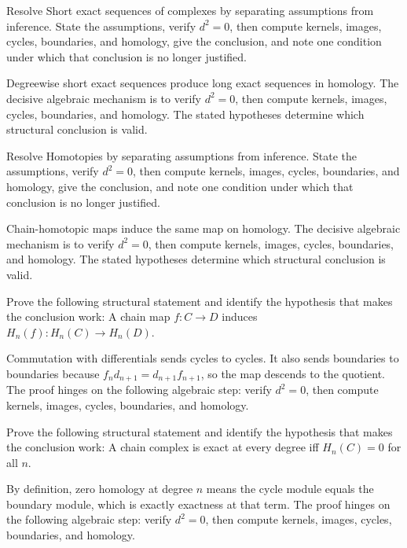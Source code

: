 \begin{problem}\label{prob:v22-problem-07}
Resolve Short exact sequences of complexes by separating assumptions from inference. State the assumptions, verify \(d^2=0\), then compute kernels, images, cycles, boundaries, and homology, give the conclusion, and note one condition under which that conclusion is no longer justified.
\end{problem}
\begin{solution}
Degreewise short exact sequences produce long exact sequences in homology. The decisive algebraic mechanism is to verify \(d^2=0\), then compute kernels, images, cycles, boundaries, and homology. The stated hypotheses determine which structural conclusion is valid.
\end{solution}

\begin{problem}\label{prob:v22-problem-08}
Resolve Homotopies by separating assumptions from inference. State the assumptions, verify \(d^2=0\), then compute kernels, images, cycles, boundaries, and homology, give the conclusion, and note one condition under which that conclusion is no longer justified.
\end{problem}
\begin{solution}
Chain-homotopic maps induce the same map on homology. The decisive algebraic mechanism is to verify \(d^2=0\), then compute kernels, images, cycles, boundaries, and homology. The stated hypotheses determine which structural conclusion is valid.
\end{solution}

\begin{problem}\label{prob:v22-problem-09}
Prove the following structural statement and identify the hypothesis that makes the conclusion work: A chain map $f:C\to D$ induces $H_n(f):H_n(C)\to H_n(D)$.
\end{problem}
\begin{solution}
Commutation with differentials sends cycles to cycles. It also sends boundaries to boundaries because $f_n d_{n+1}=d_{n+1}f_{n+1}$, so the map descends to the quotient. The proof hinges on the following algebraic step: verify \(d^2=0\), then compute kernels, images, cycles, boundaries, and homology.
\end{solution}

\begin{problem}\label{prob:v22-problem-10}
Prove the following structural statement and identify the hypothesis that makes the conclusion work: A chain complex is exact at every degree iff $H_n(C)=0$ for all $n$.
\end{problem}
\begin{solution}
By definition, zero homology at degree $n$ means the cycle module equals the boundary module, which is exactly exactness at that term. The proof hinges on the following algebraic step: verify \(d^2=0\), then compute kernels, images, cycles, boundaries, and homology.
\end{solution}


